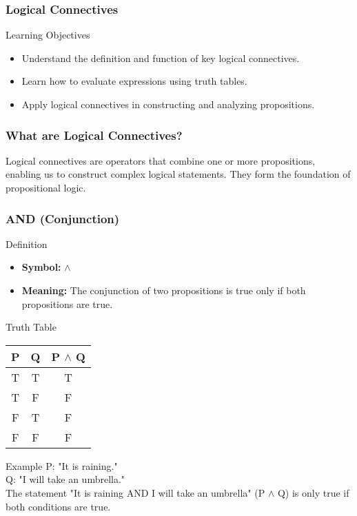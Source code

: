 \documentclass[aspectratio=169]{beamer}
\begin{document}
\begin{frame}[fragile]
    \frametitle{Logical Connectives}
    \begin{block}{Learning Objectives}
        \begin{itemize}
            \item Understand the definition and function of key logical connectives.
            \item Learn how to evaluate expressions using truth tables.
            \item Apply logical connectives in constructing and analyzing propositions.
        \end{itemize}
    \end{block}
\end{frame}

\begin{frame}[fragile]
    \frametitle{What are Logical Connectives?}
    Logical connectives are operators that combine one or more propositions, enabling us to construct complex logical statements. They form the foundation of propositional logic.
\end{frame}

\begin{frame}[fragile]
    \frametitle{AND (Conjunction)}
    \begin{block}{Definition}
        \begin{itemize}
            \item \textbf{Symbol:} $\land$
            \item \textbf{Meaning:} The conjunction of two propositions is true only if both propositions are true.
        \end{itemize}
    \end{block}
    \begin{block}{Truth Table}
        \begin{center}
            \begin{tabular}{|c|c|c|}
                \hline
                P & Q & P $\land$ Q \\
                \hline
                T & T & T \\
                T & F & F \\
                F & T & F \\
                F & F & F \\
                \hline
            \end{tabular}
        \end{center}
    \end{block}
    \begin{block}{Example}
        P: "It is raining." \\
        Q: "I will take an umbrella." \\
        The statement "It is raining AND I will take an umbrella" (P $\land$ Q) is only true if both conditions are true.
    \end{block}
\end{frame}
\end{document}
